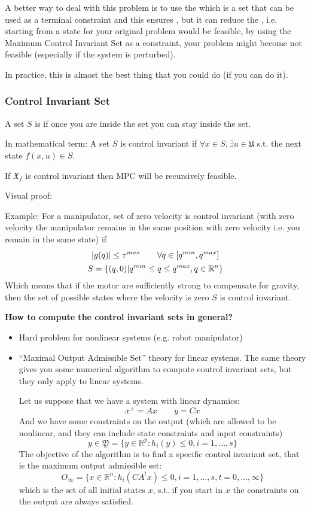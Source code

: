 A better way to deal with this problem is to use the  which is a set that can be used as a terminal constraint and this ensures , but it can reduce the , i.e. starting from a state for your original problem would be feasible, by using the Maximum Control Invariant Set as a constraint, your problem might become not feasible (especially if the system is perturbed).

In practice, this is almost the best thing that you could do (if you can do it).

\subsubsection{Control Invariant Set}
A set $S$ is  if once you are inside the set you can stay inside the set.

In mathematical term:
A set $S$ is control invariant if $\forall x \in S, \exists u\in \mathfrak{U}$ s.t. the next state $f(x,u)\in S$.

\begin{theorem}
If $\mathfrak{X}_f$ is control invariant then MPC will be recursively feasible.
\end{theorem}
Visual proof:

Example:
For a manipulator, set of zero velocity is control invariant (with zero velocity the manipulator remains in the same position with zero velocity i.e. you remain in the same state) if 
\begin{gather*}
\lvert g(q)\rvert\le \tau^{max}\qquad\forall q \in[q^{min},q^{max}]\\
S=\{(q,0)|q^{min}\le q\le q^{max}, q\in\mathbb{R}^n\}
\end{gather*}
Which means that if the motor are sufficiently strong to compensate for gravity, then the set of possible states where the velocity is zero $S$ is control invariant.

\begin{center}
\textbf{How to compute the control invariant sets in general?}
\end{center}
\begin{itemize}
\item Hard problem for nonlinear systems (e.g. robot manipulator)
\item ``Maximal Output Admissible Set'' theory for linear systems. The same theory gives you some numerical algorithm to compute control invariant sets, but they only apply to linear systems.

Let us suppose that we have a system with linear dynamics:
\[x^+ = Ax\qquad y=Cx\]
And we have some constraints on the output (which are allowed to be nonlinear, and they can include state constraints and input constraints)
\[y\in\mathfrak{Y} = \{y\in\mathbb{R}^p: h_i(y)\le 0, i=1,...,s\}\]
The objective of the algorithm is to find a specific control invariant set, that is the maximum output admissible set:
\[O_{\infty} = \{x\in\mathbb{R}^n: h_i(CA^tx)\le 0, i=1,...,s, t=0,...,\infty\}\]
which is the set of all initial states $x$, s.t. if you start in $x$ the constraints on the output are always satisfied.
\end{itemize}

